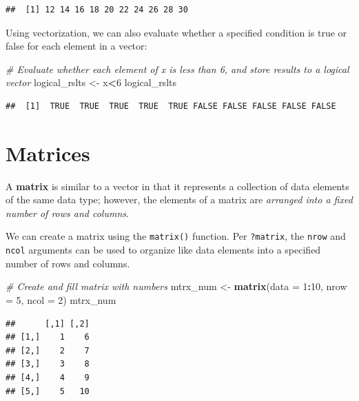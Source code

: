 \documentclass[]{book}
\newenvironment{Shaded}{\begin{snugshade}}{\end{snugshade}}
\newcommand{\CommentTok}[1]{\textcolor[rgb]{0.56,0.35,0.01}{\textit{#1}}}
\newcommand{\DataTypeTok}[1]{\textcolor[rgb]{0.13,0.29,0.53}{#1}}
\newcommand{\DecValTok}[1]{\textcolor[rgb]{0.00,0.00,0.81}{#1}}
\newcommand{\KeywordTok}[1]{\textcolor[rgb]{0.13,0.29,0.53}{\textbf{#1}}}
\newcommand{\NormalTok}[1]{#1}
\newcommand{\OperatorTok}[1]{\textcolor[rgb]{0.81,0.36,0.00}{\textbf{#1}}}
\newcommand{\StringTok}[1]{\textcolor[rgb]{0.31,0.60,0.02}{#1}}
\begin{document}
\begin{verbatim}
##  [1] 12 14 16 18 20 22 24 26 28 30
\end{verbatim}

Using vectorization, we can also evaluate whether a specified condition is true or false for each element in a vector:

\begin{Shaded}
\begin{Highlighting}[]
\CommentTok{# Evaluate whether each element of x is less than 6, and store results to a logical vector}
\NormalTok{logical_rslts <-}\StringTok{ }\NormalTok{x}\OperatorTok{<}\DecValTok{6}
\NormalTok{logical_rslts}
\end{Highlighting}
\end{Shaded}

\begin{verbatim}
##  [1]  TRUE  TRUE  TRUE  TRUE  TRUE FALSE FALSE FALSE FALSE FALSE
\end{verbatim}

\hypertarget{matrices}{%
\section{Matrices}\label{matrices}}

A \textbf{matrix} is similar to a vector in that it represents a collection of data elements of the same data type; however, the elements of a matrix are \emph{arranged into a fixed number of rows and columns}.

We can create a matrix using the \texttt{matrix()} function. Per \texttt{?matrix}, the \texttt{nrow} and \texttt{ncol} arguments can be used to organize like data elements into a specified number of rows and columns.

\begin{Shaded}
\begin{Highlighting}[]
\CommentTok{# Create and fill matrix with numbers}
\NormalTok{mtrx_num <-}\StringTok{ }\KeywordTok{matrix}\NormalTok{(}\DataTypeTok{data =} \DecValTok{1}\OperatorTok{:}\DecValTok{10}\NormalTok{, }\DataTypeTok{nrow =} \DecValTok{5}\NormalTok{, }\DataTypeTok{ncol =} \DecValTok{2}\NormalTok{)}
\NormalTok{mtrx_num}
\end{Highlighting}
\end{Shaded}

\begin{verbatim}
##      [,1] [,2]
## [1,]    1    6
## [2,]    2    7
## [3,]    3    8
## [4,]    4    9
## [5,]    5   10
\end{verbatim}
\end{document}

